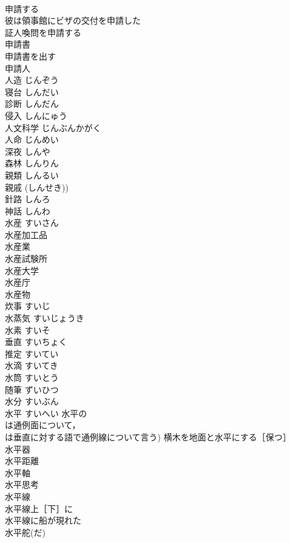 \documentclass[8pt]{extreport}
\begin{document}
\begin{CJK}{UTF8}{min}
\\	申請する 
\\	彼は領事館にビザの交付を申請した 
\\	証人喚問を申請する 
\\	申請書 
\\	申請書を出す 
\\	申請人 
\\	人造	じんぞう	
\\	寝台	しんだい	
\\	診断	しんだん	
\\	侵入	しんにゅう	
\\	人文科学	じんぶんかがく	
\\	人命	じんめい	
\\	深夜	しんや	
\\	森林	しんりん	
\\	親類	しんるい	
\\	親戚 (しんせき))
\\	針路	しんろ	
\\	神話	しんわ	
\\	水産	すいさん	
\\	水産加工品 
\\	水産業 
\\	水産試験所 
\\	水産大学 
\\	水産庁 
\\	水産物 
\\	炊事	すいじ	
\\	水蒸気	すいじょうき	
\\	水素	すいそ	
\\	垂直	すいちょく	
\\	推定	すいてい	
\\	水滴	すいてき	
\\	水筒	すいとう	
\\	随筆	ずいひつ	
\\	水分	すいぶん	
\\	水平	すいへい	水平の 
\\	は通例面について，
\\	は垂直に対する語で通例線について言う) 横木を地面と水平にする［保つ］ 
\\	水平器 
\\	水平距離 
\\	水平軸 
\\	水平思考 
\\	水平線 
\\	水平線上［下］に 
\\	水平線に船が現れた 
\\	水平舵(だ) 

\end{CJK}
\end{document}
